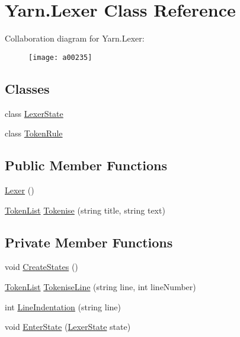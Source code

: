 \hypertarget{a00047}{\section{Yarn.\-Lexer Class Reference}
\label{a00047}
}


Collaboration diagram for Yarn.\-Lexer\-:
\nopagebreak
\begin{figure}[H]
\begin{center}
\leavevmode
\texttt{[image: a00235]}
\end{center}
\end{figure}
\subsection*{Classes}
\begin{DoxyCompactItemize}
\item 
class \hyperlink{a00048}{Lexer\-State}
\item 
class \hyperlink{a00082}{Token\-Rule}
\end{DoxyCompactItemize}
\subsection*{Public Member Functions}
\begin{DoxyCompactItemize}
\item 
\hyperlink{a00047_a4bf394bcf675142f33c90541be7dd571}{Lexer} ()
\item 
\hyperlink{a00081}{Token\-List} \hyperlink{a00047_a6a09f1bb13f28acd95fd081954b45437}{Tokenise} (string title, string text)
\end{DoxyCompactItemize}
\subsection*{Private Member Functions}
\begin{DoxyCompactItemize}
\item 
void \hyperlink{a00047_a646081a52b241abaafe5e0cfaeafd751}{Create\-States} ()
\item 
\hyperlink{a00081}{Token\-List} \hyperlink{a00047_a20b63f6ef434f6a40fd388f262f03fa8}{Tokenise\-Line} (string line, int line\-Number)
\item 
int \hyperlink{a00047_a4079b10b099e5d85f5482f9e7eac4179}{Line\-Indentation} (string line)
\item 
void \hyperlink{a00047_ad3ef08f822b310d9864774b057b96995}{Enter\-State} (\hyperlink{a00048}{Lexer\-State} state)
\end{DoxyCompactItemize}
